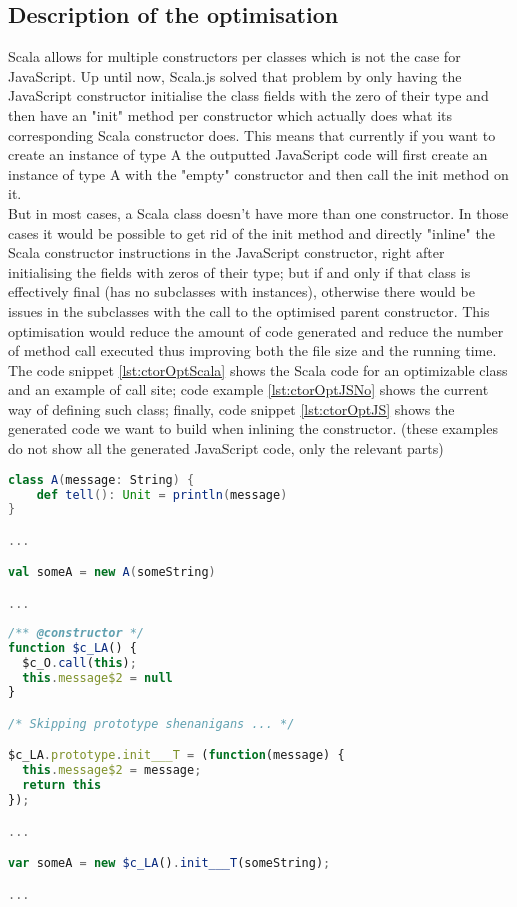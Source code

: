 \subsection{Description of the optimisation}
Scala allows for multiple constructors per classes which is not the case for
JavaScript. Up until now, Scala.js solved that problem by only having the
JavaScript constructor initialise the class fields with the zero of their type
and then have an "init" method per constructor which actually does what its
corresponding Scala constructor does. This means that currently if you want to
create an instance of type A the outputted JavaScript code will first create an
instance of type A with the "empty" constructor and then call the init method
on it. \\
But in most cases, a Scala class doesn't have more than one constructor. In
those cases it would be possible to get rid of the init method
and directly "inline" the Scala constructor instructions in the JavaScript
constructor, right after initialising the fields with zeros of their type;
but if and only if that class is effectively final (has no subclasses with
instances), otherwise there would be issues in the subclasses with the call to
the optimised parent constructor.
This optimisation would reduce the amount of code generated and reduce the
number of method call executed thus improving both the file size and the
running time. The code snippet \ref{lst:ctorOptScala} shows the Scala code for
an optimizable class and an example of call site; code example
\ref{lst:ctorOptJSNo} shows the current way of defining such class; finally,
code snippet \ref{lst:ctorOptJS} shows the generated code we want to build when
inlining the constructor. (these examples do not show all the generated
JavaScript code, only the relevant parts)

\begin{lstlisting}[language=scala,caption=Example Scala Code.,
label={lst:ctorOptScala}]
class A(message: String) {
    def tell(): Unit = println(message)
}

...

val someA = new A(someString)

...

\end{lstlisting}
\begin{lstlisting}[language=javascript,caption=Generated JavaScript without
optimisation., label={lst:ctorOptJSNo}]
/** @constructor */
function $c_LA() {
  $c_O.call(this);
  this.message$2 = null
}

/* Skipping prototype shenanigans ... */

$c_LA.prototype.init___T = (function(message) {
  this.message$2 = message;
  return this
});

...

var someA = new $c_LA().init___T(someString);

...

\end{lstlisting}

